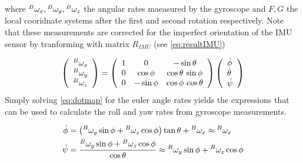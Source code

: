     where \ensuremath{\prescript{B}{}{\omega_{x}},\prescript{B}{}{\omega_{y}},\prescript{B}{}{\omega_{z}}} the angular rates maeasured by the gyroscope and \ensuremath{F,G} the local cooridnate systems after the first and second rotation respectively. Note that these measurements are corrected for the imperfect orientation of the IMU sensor by tranforming with matrix \ensuremath{R_{\mathit{IMU}}} (see \cref{eq:resultIMU})

    \begin{equation}
    \left(\begin{array}{c}{\prescript{B}{}{\omega_{x}}} \\ {\prescript{B}{}{\omega_{y}}} \\ {\prescript{B}{}{\omega_{z}}}\end{array}\right)=\left(\begin{array}{ccc} 1 & 0 & -\sin\theta \\ 0 & \cos\phi & \cos\theta \,\sin\phi \\ 0 & -\sin\phi & \cos\phi\,\cos\theta \end{array}\right)\left(\begin{array}{l}{\dot{\phi}} \\ {\dot{\theta}} \\ {\dot{\psi}}\end{array}\right)
        \label{eq:dotmap}
    \end{equation}
    Simply solving \cref{eq:dotmap} for the euler angle rates yields the expressions that can be used to calculate the roll and yaw rates from gyroscope measurements. 

\begin{align}
    \dot{\phi} &=\left(\prescript{B}{}{\omega_{y}} \sin \phi+\prescript{B}{}{\omega_{z}} \cos \phi\right) \tan \theta+\prescript{B}{}{\omega_{x}} \approx \prescript{B}{}{\omega_{x}}
    \label{eq:appb1}
    \\
    \dot{\psi} &=\frac{\prescript{B}{}{\omega_{y}} \sin \phi+\prescript{B}{}{\omega_{z}} \cos \phi}{\cos \theta} \approx \prescript{B}{}{\omega_{y}} \sin \phi+\prescript{B}{}{\omega_{z}} \cos \phi
    \label{eq:appb2}
\end{align}

